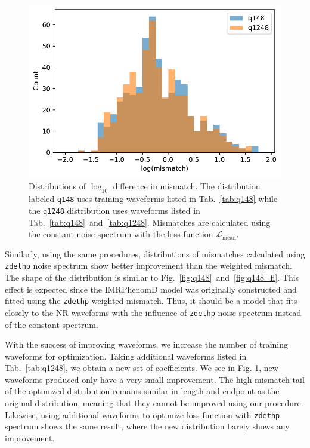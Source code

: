 \documentclass[twocolumn]{aastex631}
\newcommand{\zdethp}{\texttt{zdethp}}
\begin{document}
\begin{figure}[t]
	\centering
	\includegraphics[width=\columnwidth]{../static/q148_q1248_compare.pdf}
	\caption{Distributions of $\log_{10}$ difference in mismatch. The distribution labeled \texttt{q148} uses training waveforms listed in Tab.~\ref{tab:q148} while the \texttt{q1248} distribution uses waveforms listed in Tab.~\ref{tab:q148}~and~\ref{tab:q1248}. Mismatches are calculated using the constant noise spectrum with the loss function $\mathcal{L}_{\mathrm{mean}}$.}
	\label{fig:q148_q1248_compare}
\end{figure}

Similarly, using the same procedures, distributions of mismatches calculated using {\zdethp} noise spectrum show better improvement than the weighted mismatch. The shape of the distribution is similar to Fig.~\ref{fig:q148}~and~\ref{fig:q148_fl}. This effect is expected since the IMRPhenomD model was originally constructed and fitted using the {\zdethp} weighted mismatch. Thus, it should be a model that fits closely to the NR waveforms with the influence of {\zdethp} noise spectrum instead of the constant spectrum. 

With the success of improving waveforms, we increase the number of training waveforms for optimization. Taking additional waveforms listed in Tab.~\ref{tab:q1248}, we obtain a new set of coefficients. We see in Fig. \ref{fig:q148_q1248_compare}, new waveforms produced only have a very small improvement. The high mismatch tail of the optimized distribution remains similar in length and endpoint as the original distribution, meaning that they cannot be improved using our procedure. Likewise, using additional waveforms to optimize loss function with {\zdethp} spectrum shows the same result, where the new distribution barely shows any improvement. 
\end{document}
